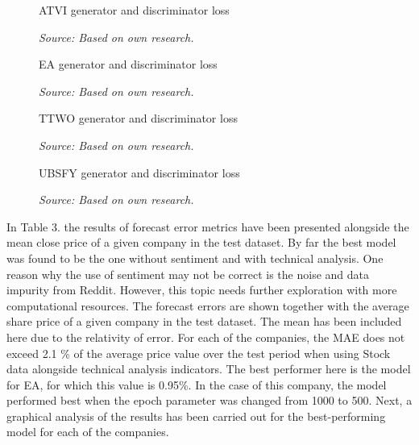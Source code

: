 \documentclass[11pt]{article} %
\begin{document}
\begin{figure}[H]
\caption{ATVI generator and discriminator loss}
\begin{adjustbox}{width=1.3\textwidth,center}

\end{adjustbox}
\caption*{\textit{Source: Based on own research.}}
\end{figure}

\begin{figure}[H]
\caption{EA generator and discriminator loss}
\begin{adjustbox}{width=1.3\textwidth,center}

\end{adjustbox}
\caption*{\textit{Source: Based on own research.}}
\end{figure}


\begin{figure}[H]
\caption{TTWO generator and discriminator loss}
\begin{adjustbox}{width=1.3\textwidth,center}

\end{adjustbox}
\caption*{\textit{Source: Based on own research.}}
\end{figure}

\begin{figure}[H]
\caption{UBSFY generator and discriminator loss}
\begin{adjustbox}{width=1.3\textwidth,center}

\end{adjustbox}
\caption*{\textit{Source: Based on own research.}}
\end{figure}


In Table 3. the results of forecast error metrics have been presented alongside the mean close price of a given company in the test dataset. By far the best model was found to be the one without sentiment and with technical analysis. One reason why the use of sentiment may not be correct is the noise and data impurity from Reddit. However, this topic needs further exploration with more computational resources. 
The forecast errors are shown together with the average share price of a given company in the test dataset. The mean has been included here due to the relativity of error. For each of the companies, the MAE does not exceed 2.1 \% of the average price value over the test period when using Stock data alongside technical analysis indicators. The best performer here is the model for EA, for which this value is 0.95\%. In the case of this company, the model performed best when the epoch parameter was changed from 1000 to 500. Next, a graphical analysis of the results has been carried out for the best-performing model for each of the companies.
\end{document}
